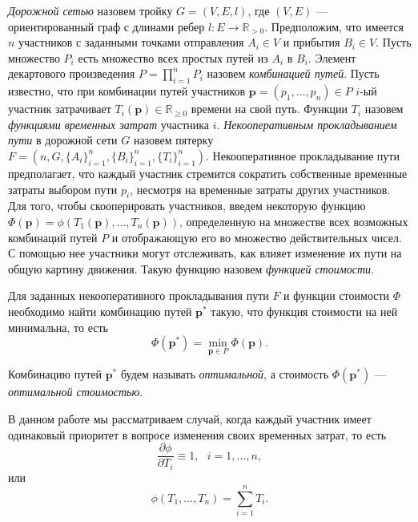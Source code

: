 \documentclass[12pt, a4paper]{article}
\DeclareMathOperator*{\minn}{min}
\begin{document}
\textit {Дорожной сетью} назовем тройку $G = (V, E, l)$, где $(V, E)$ --- ориентированный граф с длинами ребер $l: E \rightarrow \mathbb{R}_{>0} $.  Предположим, что имеется $n$ участников с заданными точками отправления $A_i \in V$ и прибытия $B_i \in V$. Пусть множество $P_i$ есть множество всех простых путей из $A_i$ в $B_i$. Элемент декартового произведения ${P = \prod \limits_{i = 1} ^ n P_i}$ назовем \textit{комбинацией путей}. Пусть известно, что при комбинации путей участников $\textbf{p} = \left(p_1, \ldots, p_n\right)\in P$ $i$-ый участник затрачивает $T_i(\textbf{p}) \in \mathbb{R}_{\ge 0}$ времени на свой путь. 
Функции $T_i$ назовем \textit{функциями временных затрат} участника $i$.
\textit{Некооперативным прокладыванием пути} в дорожной сети $G$ назовем пятерку $F = (n, G, \{A_i\}_{i = 1}^{n}, \{B_i\}_{i = 1}^{n}, \{T_i\}_{i = 1}^{n})$. Некооперативное прокладывание пути предполагает, что каждый участник стремится сократить собственные временные затраты выбором пути $p_i$, несмотря на временные затраты других участников. 
Для того, чтобы скооперировать участников, введем некоторую функцию $\Phi (\textbf{p}) = \phi (T_1 (\textbf{p}), \ldots, T_n(\textbf{p}))$, определенную на множестве всех возможных комбинаций путей $P$ и отображающую его во множество действительных чисел. С помощью нее участники могут отслеживать, как влияет изменение их пути на общую картину движения. Такую функцию назовем \textit{функцией стоимости}.

Для заданных некооперативного прокладывания пути $F$ и функции стоимости $\Phi$ необходимо найти комбинацию путей $\textbf{p}^*$ такую, что функция стоимости на ней минимальна, то есть
\begin{equation}
	\label{eq:target_global_task_T} 
	\Phi (\textbf{p}^*) = \minn\limits_{ \textbf{p} \in P} \Phi (\textbf{p}).
\end{equation}

Комбинацию путей $\textbf{p}^*$ будем называть \textit {оптимальной}, а стоимость  $ \Phi (\textbf{p}^*)$ --- \textit{оптимальной стоимостью}.

В данном работе мы рассматриваем случай, когда каждый участник имеет одинаковый приоритет в вопросе изменения своих временных затрат, то есть 
\begin{equation*}
	\frac{\partial \phi}{\partial T_i} \equiv 1, \text{ } i = 1, \ldots, n,
\end{equation*}
или
\begin{equation*}
\phi(T_1, \ldots, T_n) = \sum\limits_{i = 1}^nT_i.
\end{equation*}
\end{document}
